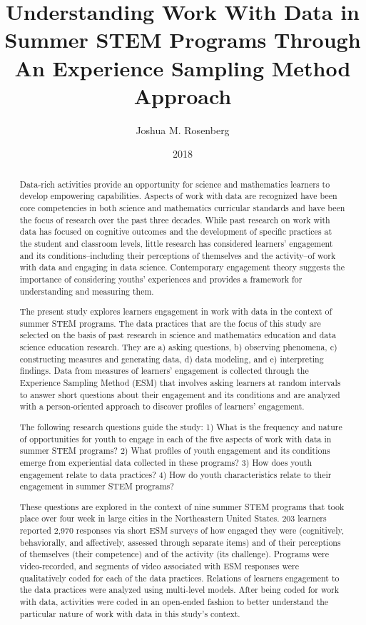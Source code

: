 \documentclass[]{msu-thesis}
\title{Understanding Work With Data in Summer STEM Programs Through An Experience Sampling Method Approach}
\author{Joshua M. Rosenberg}
\date{2018}
\theoremstyle{definition}
\theoremstyle{definition}
\theoremstyle{definition}
\theoremstyle{remark}
\begin{document}

\maketitlepage
\begin{abstract}

Data-rich activities provide an opportunity for science and mathematics learners to develop empowering capabilities. Aspects of work with data are recognized have been core competencies in both science and mathematics curricular standards and have been the focus of research over the past three decades. While past research on work with data has focused on cognitive outcomes and the development of specific practices at the student and classroom levels, little research has considered learners' engagement and its conditions--including their perceptions of themselves and the activity--of work with data and engaging in data science. Contemporary engagement theory suggests the importance of considering youths' experiences and provides a framework for understanding and measuring them.

The present study explores learners engagement in work with data in the context of summer STEM programs. The data practices that are the focus of this study are selected on the basis of past research in science and mathematics education and data science education research. They are a) asking questions, b) observing phenomena, c) constructing measures and generating data, d) data modeling, and e) interpreting findings. Data from measures of learners' engagement is collected through the Experience Sampling Method (ESM) that involves asking learners at random intervals to answer short questions about their engagement and its conditions and are analyzed with a person-oriented approach to discover profiles of learners' engagement.

The following research questions guide the study: 1) What is the frequency and nature of opportunities for youth to engage in each of the five aspects of work with data in summer STEM programs? 2) What profiles of youth engagement and its conditions emerge from experiential data collected in these programs? 3) How does youth engagement relate to data practices? 4) How do youth characteristics relate to their engagement in summer STEM programs?

These questions are explored in the context of nine summer STEM programs that took place over four week in large cities in the Northeastern United States. 203 learners reported 2,970 responses via short ESM surveys of how engaged they were (cognitively, behaviorally, and affectively, assessed through separate items) and of their perceptions of themselves (their competence) and of the activity (its challenge). Programs were video-recorded, and segments of video associated with ESM responses were qualitatively coded for each of the data practices. Relations of learners engagement to the data practices were analyzed using multi-level models. After being coded for work with data, activities were coded in an open-ended fashion to better understand the particular nature of work with data in this study's context.


\end{abstract}
\end{document}
